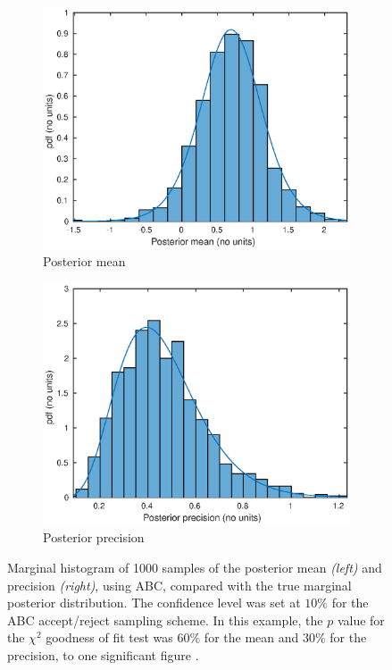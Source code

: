 \documentclass[a4paper,10pt]{article}
\begin{document}
\begin{figure}[htb]
\centering

\begin{subfigure}[b]{0.45\textwidth}
\includegraphics[width=\textwidth]{mean.eps}
\caption{Posterior mean}
\label{mean}
\end{subfigure}
\begin{subfigure}[b]{0.45\textwidth}
\includegraphics[width=\textwidth]{precision.eps}
\caption{Posterior precision}
\label{precision}
\end{subfigure}

\caption{Marginal histogram of 1000 samples of the posterior mean \emph{(left)} and precision \emph{(right)}, using ABC, compared with the true marginal posterior distribution. The confidence level was set at $10\%$ for the ABC accept/reject sampling scheme. In this example, the $p$ value for the $\chi^2$ goodness of fit test was $60\%$ for the mean and $30\%$ for the precision, to one significant figure .}
\label{fig:marginal}
\end{figure}
\end{document}
